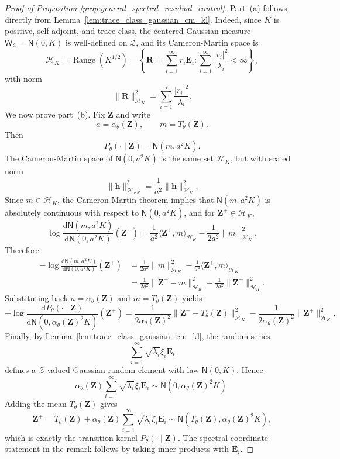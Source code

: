 \documentclass[11pt]{article}
\renewcommand{\d}{\mathrm{d}}
\begin{document}
\begin{proof}[Proof of Proposition \ref{prop:general_spectral_residual_control}]
Part~(a) follows directly from Lemma~\ref{lem:trace_class_gaussian_cm_kl}.
Indeed, since $K$ is positive, self-adjoint, and trace-class, the centered
Gaussian measure $\mathsf W_{\mathcal Z}=\mathsf N(0,K)$ is well-defined on
$\mathcal Z$, and its Cameron-Martin space is
\[
    \mathcal H_K
    =
    \operatorname{Range}(K^{1/2})
    =
    \left\{
        \mathbf R=\sum_{i=1}^\infty r_i\mathbf E_i:
        \sum_{i=1}^\infty \frac{|r_i|^2}{\lambda_i}<\infty
    \right\},
\]
with norm
\[
    \|\mathbf R\|_{\mathcal H_K}^2
    =
    \sum_{i=1}^\infty \frac{|r_i|^2}{\lambda_i}.
\]
We now prove part~(b). Fix $\mathbf Z$ and write
\[
    a=\alpha_\theta(\mathbf Z),
    \qquad
    m=T_\theta(\mathbf Z).
\]
Then
\[
    P_\theta(\cdot\mid \mathbf Z)=\mathsf N(m,a^2K).
\]
The Cameron-Martin space of $\mathsf N(0,a^2K)$ is the same set $\mathcal H_K$, but with scaled norm
\[
    \|\mathbf h\|_{\mathcal H_{a^2K}}^2
    =
    \frac{1}{a^2}\|\mathbf h\|_{\mathcal H_K}^2.
\]
Since $m\in\mathcal H_K$, the Cameron-Martin theorem implies that $\mathsf N(m,a^2K)$ is absolutely continuous with respect to $\mathsf N(0,a^2K)$, and for $\mathbf Z^+\in\mathcal H_K$,
\[
    \log
    \frac{
        \d \mathsf N(m,a^2K)
    }{
        \d \mathsf N(0,a^2K)
    }(\mathbf Z^+)
    =
    \frac{1}{a^2}
    \langle \mathbf Z^+,m\rangle_{\mathcal H_K}
    -
    \frac{1}{2a^2}\|m\|_{\mathcal H_K}^2.
\]
Therefore
\[
\begin{aligned}
    -
    \log
    \frac{
        \d \mathsf N(m,a^2K)
    }{
        \d \mathsf N(0,a^2K)
    }(\mathbf Z^+)
    &=
    \frac{1}{2a^2}\|m\|_{\mathcal H_K}^2
    -
    \frac{1}{a^2}
    \langle \mathbf Z^+,m\rangle_{\mathcal H_K}                                      \\
    &=
    \frac{1}{2a^2}
    \|\mathbf Z^+-m\|_{\mathcal H_K}^2
    -
    \frac{1}{2a^2}
    \|\mathbf Z^+\|_{\mathcal H_K}^2 .
\end{aligned}
\]
Substituting back $a=\alpha_\theta(\mathbf Z)$ and
$m=T_\theta(\mathbf Z)$ yields
\[
    -
    \log
    \frac{
        \d P_\theta(\cdot\mid\mathbf Z)
    }{
        \d\mathsf N(0,\alpha_\theta(\mathbf Z)^2K)
    }(\mathbf Z^+)
    =
    \frac{1}{2\alpha_\theta(\mathbf Z)^2}
    \|\mathbf Z^+-T_\theta(\mathbf Z)\|_{\mathcal H_K}^2-
    \frac{1}{2\alpha_\theta(\mathbf Z)^2}
    \|\mathbf Z^+\|_{\mathcal H_K}^2.
\]
Finally, by Lemma~\ref{lem:trace_class_gaussian_cm_kl}, the random series
\[
    \sum_{i=1}^\infty \sqrt{\lambda_i}\xi_i\mathbf E_i
\]
defines a $\mathcal Z$-valued Gaussian random element with law $\mathsf N(0,K)$. Hence
\[
    \alpha_\theta(\mathbf Z)
    \sum_{i=1}^\infty \sqrt{\lambda_i}\xi_i\mathbf E_i
    \sim
    \mathsf N(0,\alpha_\theta(\mathbf Z)^2K).
\]
Adding the mean $T_\theta(\mathbf Z)$ gives
\[
    \mathbf Z^+
    =
    T_\theta(\mathbf Z)
    +
    \alpha_\theta(\mathbf Z)
    \sum_{i=1}^\infty \sqrt{\lambda_i}\xi_i\mathbf E_i
    \sim
    \mathsf N(T_\theta(\mathbf Z),\alpha_\theta(\mathbf Z)^2K),
\]
which is exactly the transition kernel $P_\theta(\cdot\mid\mathbf Z)$. The spectral-coordinate statement in the remark follows by taking inner
products with $\mathbf E_i$.
\end{proof}
\end{document}
